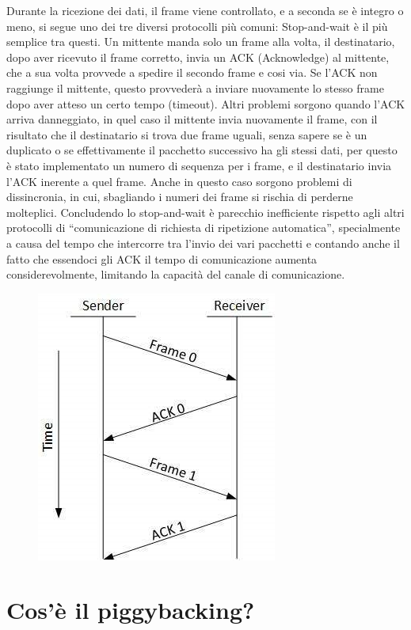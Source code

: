 Durante la ricezione dei dati, il frame viene controllato, e a seconda se è integro o meno, si segue uno dei tre diversi protocolli più comuni: 
Stop-and-wait è il più semplice tra questi.
Un mittente manda solo un frame alla volta, il destinatario, dopo aver ricevuto il frame corretto, invia un ACK (Acknowledge) al mittente, che a sua volta provvede a spedire il secondo frame e cosi via. 
Se l’ACK non raggiunge il mittente, questo provvederà a inviare nuovamente lo stesso frame dopo aver atteso un certo tempo (timeout).
Altri problemi sorgono quando l’ACK arriva danneggiato, in quel caso il mittente invia nuovamente il frame, con il risultato che il destinatario si trova due frame uguali, senza sapere se è un duplicato o se effettivamente il pacchetto successivo ha gli stessi dati, per questo è stato implementato un numero di sequenza per i frame, e il destinatario invia l’ACK inerente a quel frame.
Anche in questo caso sorgono problemi di dissincronia, in cui, sbagliando i numeri dei frame si rischia di perderne molteplici.
Concludendo lo stop-and-wait è parecchio inefficiente rispetto agli altri protocolli di “comunicazione di richiesta di ripetizione automatica”, specialmente a causa del tempo che intercorre tra l’invio dei vari pacchetti e contando anche il fatto che essendoci gli ACK il tempo di comunicazione aumenta considerevolmente, limitando la capacità del canale di comunicazione.
 
\begin{figure}[H]
\centering
\includegraphics[scale=0.65]{res/img/17_StopAndWait.png}
\end{figure}
	     
\section{Cos’è il piggybacking?}

